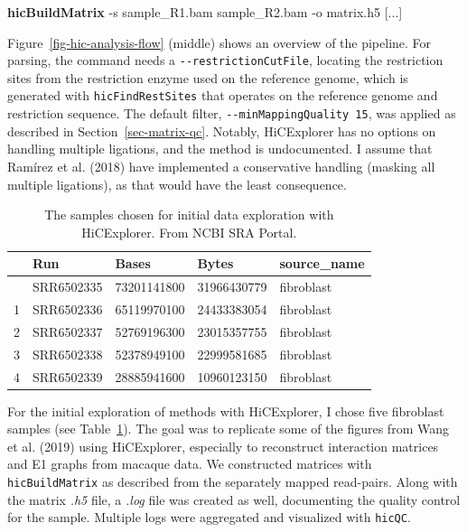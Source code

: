 \documentclass[
  11pt,
  a4paper,
]{scrbook}
\newenvironment{Shaded}{\begin{snugshade}}{\end{snugshade}}
\newcommand{\AttributeTok}[1]{\textcolor[rgb]{0.00,0.34,0.68}{#1}}
\newcommand{\ExtensionTok}[1]{\textcolor[rgb]{0.00,0.58,1.00}{\textbf{#1}}}
\newcommand{\NormalTok}[1]{\textcolor[rgb]{0.12,0.11,0.11}{#1}}
\newcommand{\PreprocessorTok}[1]{\textcolor[rgb]{0.00,0.43,0.16}{#1}}
\newcommand{\SpecialStringTok}[1]{\textcolor[rgb]{1.00,0.33,0.00}{#1}}
\renewenvironment{Shaded}
{
  \vspace{-0.5em} %
  \begin{snugshade} %
  \small %
}
{
  \end{snugshade} %
  \vspace{-1em} %
}
\begin{document}
\begin{Shaded}
\begin{Highlighting}[]
\ExtensionTok{hicBuildMatrix} \AttributeTok{{-}s}\NormalTok{ sample\_R1.bam sample\_R2.bam }\AttributeTok{{-}o}\NormalTok{ matrix.h5 }\PreprocessorTok{[}\SpecialStringTok{...}\PreprocessorTok{]}
\end{Highlighting}
\end{Shaded}

Figure~\ref{fig-hic-analysis-flow} (middle) shows an overview of the
pipeline. For parsing, the command needs a
\texttt{-\/-restrictionCutFile}, locating the restriction sites from the
restriction enzyme used on the reference genome, which is generated with
\texttt{hicFindRestSites} that operates on the reference genome and
restriction sequence. The default filter,
\texttt{-\/-minMappingQuality\ 15}, was applied as described in
Section~\ref{sec-matrix-qc}. Notably, HiCExplorer has no options on
handling multiple ligations, and the method is undocumented. I assume
that Ramírez et al. (2018) have implemented a conservative handling
(masking all multiple ligations), as that would have the least
consequence.

{

\begin{longtable}[]{@{}lllll@{}}

\caption{\label{tbl-hic-exploration}The samples chosen for initial data
exploration with HiCExplorer. From NCBI SRA Portal.}

\tabularnewline

\toprule\noalign{}
& Run & Bases & Bytes & source\_name \\
\midrule\noalign{}
\endhead
\bottomrule\noalign{}
\endlastfoot
0 & SRR6502335 & 73201141800 & 31966430779 & fibroblast \\
1 & SRR6502336 & 65119970100 & 24433383054 & fibroblast \\
2 & SRR6502337 & 52769196300 & 23015357755 & fibroblast \\
3 & SRR6502338 & 52378949100 & 22999581685 & fibroblast \\
4 & SRR6502339 & 28885941600 & 10960123150 & fibroblast \\

\end{longtable}

}

For the initial exploration of methods with HiCExplorer, I chose five
fibroblast samples (see Table~\ref{tbl-hic-exploration}). The goal was
to replicate some of the figures from Wang et al. (2019) using
HiCExplorer, especially to reconstruct interaction matrices and E1
graphs from macaque data. We constructed matrices with
\texttt{hicBuildMatrix} as described from the separately mapped
read-pairs. Along with the matrix \emph{.h5} file, a \emph{.log} file
was created as well, documenting the quality control for the sample.
Multiple logs were aggregated and visualized with \texttt{hicQC}.
\end{document}
